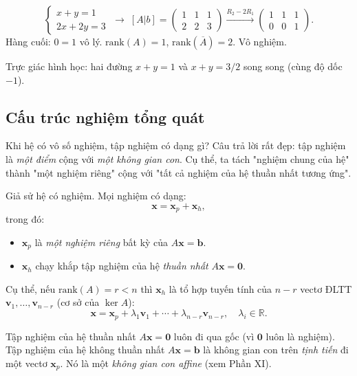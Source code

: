 \documentclass[12pt,a4paper]{article}
\begin{document}
\begin{vidu}[title={Vô nghiệm}]
\[
  \begin{cases}x+y=1\\ 2x+2y=3\end{cases}\;\to\; [A|b] = \left(\begin{array}{cc|c}1&1&1\\2&2&3\end{array}\right) \xrightarrow{R_2 - 2R_1} \left(\begin{array}{cc|c}1&1&1\\0&0&1\end{array}\right).
\]
Hàng cuối: $0 = 1$ vô lý. $\mathrm{rank}(A) = 1$, $\mathrm{rank}(\overline{A}) = 2$. Vô nghiệm.

Trực giác hình học: hai đường $x+y=1$ và $x+y=3/2$ song song (cùng độ dốc $-1$).
\end{vidu}

\subsection{Cấu trúc nghiệm tổng quát}

\begin{dongco}
Khi hệ có vô số nghiệm, tập nghiệm có dạng gì? Câu trả lời rất đẹp: tập nghiệm là \emph{một điểm} cộng với \emph{một không gian con}. Cụ thể, ta tách "nghiệm chung của hệ" thành "một nghiệm riêng" cộng với "tất cả nghiệm của hệ thuần nhất tương ứng".
\end{dongco}

\begin{dinhly}[title={Cấu trúc nghiệm $A\mathbf{x} = \mathbf{b}$}]
Giả sử hệ có nghiệm. Mọi nghiệm có dạng:
\[
  \mathbf{x} = \mathbf{x}_p + \mathbf{x}_h,
\]
trong đó:
\begin{itemize}
  \item $\mathbf{x}_p$ là \emph{một nghiệm riêng} bất kỳ của $A\mathbf{x} = \mathbf{b}$.
  \item $\mathbf{x}_h$ chạy khắp tập nghiệm của hệ \emph{thuần nhất} $A\mathbf{x} = \mathbf{0}$.
\end{itemize}
Cụ thể, nếu $\mathrm{rank}(A) = r < n$ thì $\mathbf{x}_h$ là tổ hợp tuyến tính của $n-r$ vectơ ĐLTT $\mathbf{v}_1, \ldots, \mathbf{v}_{n-r}$ (cơ sở của $\ker A$):
\[
  \mathbf{x} = \mathbf{x}_p + \lambda_1 \mathbf{v}_1 + \cdots + \lambda_{n-r} \mathbf{v}_{n-r}, \quad \lambda_i \in \mathbb{R}.
\]
\end{dinhly}

\begin{ynghia}[title={Hình học: tập nghiệm là đường/mặt phẳng dịch chuyển}]
Tập nghiệm của hệ thuần nhất $A\mathbf{x} = \mathbf{0}$ luôn đi qua gốc (vì $\mathbf{0}$ luôn là nghiệm). Tập nghiệm của hệ không thuần nhất $A\mathbf{x} = \mathbf{b}$ là không gian con trên \emph{tịnh tiến} đi một vectơ $\mathbf{x}_p$. Nó là một \emph{không gian con affine} (xem Phần XI).
\end{ynghia}
\end{document}
